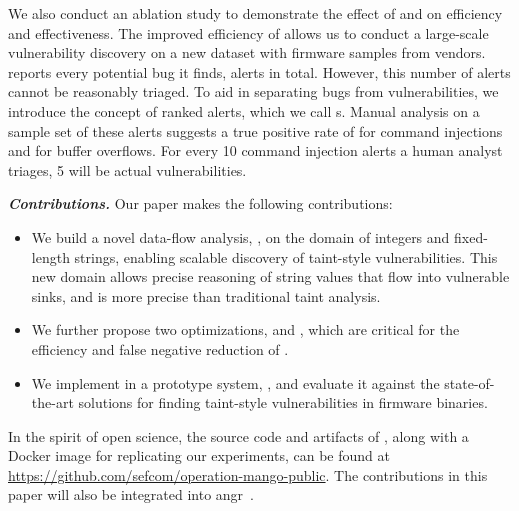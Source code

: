 We also conduct an ablation study to demonstrate the effect of \rev and \assumed on efficiency and effectiveness.
The improved efficiency of \mango allows us to conduct a large-scale vulnerability discovery on a new dataset with \ldsize firmware samples from \ldvendors vendors.
\mango reports every potential bug it finds, \mangoTotalAlerts alerts in total.
However, this number of alerts cannot be reasonably triaged.
To aid in separating bugs from vulnerabilities, we introduce the concept of ranked alerts, which we call \trupoc{}s.
Manual analysis on a sample set of these alerts suggests a true positive rate of \mangocmdiTP for command injections and \mangooverflowTP for buffer overflows.
For every 10 command injection alerts a human analyst triages, 5 will be actual vulnerabilities.

\smallskip
\noindent
\textbf{\textit{Contributions.}}
Our paper makes the following contributions:

\begin{itemize}[noitemsep]
    \item
          We build a novel data-flow analysis, \rda, on the domain of integers and fixed-length strings, enabling scalable discovery of taint-style vulnerabilities.
          This new domain allows precise reasoning of string values that flow into vulnerable sinks, and is more precise than traditional taint analysis.

    \item
          We further propose two optimizations, \rev and \assumed, which are critical for the efficiency and false negative reduction of \rda.

    \item
          We implement \rda in a prototype system, \mango, and evaluate it against the state-of-the-art solutions for finding taint-style vulnerabilities in firmware binaries.

\end{itemize}

\smallskip
\noindent
\begin{sloppypar}
In the spirit of open science, the source code and artifacts of \mango, along with a Docker image for replicating our experiments, can be found at \url{https://github.com/sefcom/operation-mango-public}.
The contributions in this paper will also be integrated into angr~\cite{wang2017angr}.
\end{sloppypar}




